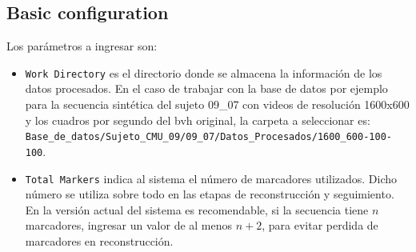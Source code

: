  \subsection{Basic configuration}
 Los parámetros a ingresar son:
 \begin{itemize}
  \item \texttt{Work Directory} es el directorio donde se almacena la información de los datos procesados. En el caso de trabajar con la base de datos por ejemplo para la secuencia sintética del sujeto 09\_07 con videos de resolución 1600x600 y los cuadros por segundo del bvh original, la carpeta a seleccionar es:\\ \texttt{Base\_de\_datos/Sujeto\_CMU\_09/09\_07/Datos\_Procesados/1600\_600-100-100}.
  \item \texttt{Total Markers} indica al sistema el número de marcadores utilizados. Dicho número se utiliza sobre todo en las etapas de reconstrucción y seguimiento. En la versión actual del sistema es recomendable, si la secuencia tiene $n$ marcadores, ingresar un valor de al menos $n+2$, para evitar perdida de  marcadores en reconstrucción.   
 \end{itemize}
 
